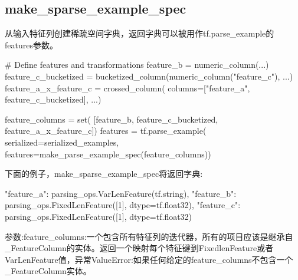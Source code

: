 \subsection{make\_sparse\_example\_spec}
从输入特征列创建稀疏空间字典，返回字典可以被用作tf.parse\_example的features参数。
\begin{python}
# Define features and transformations
feature_b = numeric_column(...)
feature_c_bucketized = bucketized_column(numeric_column("feature_c"), ...)
feature_a_x_feature_c = crossed_column(
    columns=["feature_a", feature_c_bucketized], ...)

feature_columns = set(
    [feature_b, feature_c_bucketized, feature_a_x_feature_c])
features = tf.parse_example(
    serialized=serialized_examples,
    features=make_parse_example_spec(feature_columns))
\end{python}
下面的例子，make\_sparse\_example\_spec将返回字典:
\begin{python}
{
    "feature_a": parsing_ops.VarLenFeature(tf.string),
    "feature_b": parsing_ops.FixedLenFeature([1], dtype=tf.float32),
    "feature_c": parsing_ops.FixedLenFeature([1], dtype=tf.float32)
}
\end{python}
参数:feature\_columns:一个包含所有特征列的迭代器，所有的项目应该是继承自\_FeatureColumn的实体。返回一个映射每个特征键到FixedlenFeature或者VarLenFeature值，异常ValueError:如果任何给定的feature\_columns不包含一个\_FeatureColumn实体。
